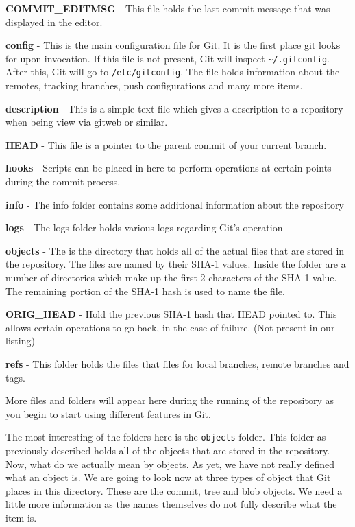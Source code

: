 \textbf{COMMIT\_EDITMSG} - This file holds the last commit message that was displayed in the editor.

\textbf{config} - This is the main configuration file for Git.  It is the first place git looks for upon invocation.  If this file is not present, Git will inspect \texttt{\textasciitilde/.gitconfig}.  After this, Git will go to \texttt{/etc/gitconfig}.  The file holds information about the remotes, tracking branches, push configurations and many more items.

\textbf{description} - This is a simple text file which gives a description to a repository when being view via gitweb or similar.

\textbf{HEAD} - This file is a pointer to the parent commit of your current branch.

\textbf{hooks} - Scripts can be placed in here to perform operations at certain points during the commit process.

\textbf{info} - The info folder contains some additional information about the repository

\textbf{logs} - The logs folder holds various logs regarding Git's operation

\textbf{objects} - The is the directory that holds all of the actual files that are stored in the repository.  The files are named by their SHA-1 values.  Inside the folder are a number of directories which make up the first 2 characters of the SHA-1 value.  The remaining portion of the SHA-1 hash is used to name the file.

\textbf{ORIG\_HEAD} - Hold the previous SHA-1 hash that HEAD pointed to.  This allows certain operations to go back, in the case of failure. (Not present in our listing)

\textbf{refs} - This folder holds the files that files for local branches, remote branches and tags.

More files and folders will appear here during the running of the repository as you begin to start using different features in Git.

The most interesting of the folders here is the \texttt{objects} folder.  This folder as previously described holds all of the objects that are stored in the repository.  Now, what do we actually mean by objects.  As yet, we have not really defined what an object is.  We are going to look now at three types of object that Git places in this directory.  These are the commit, tree and blob objects.  We need a little more information as the names themselves do not fully describe what the item is.

